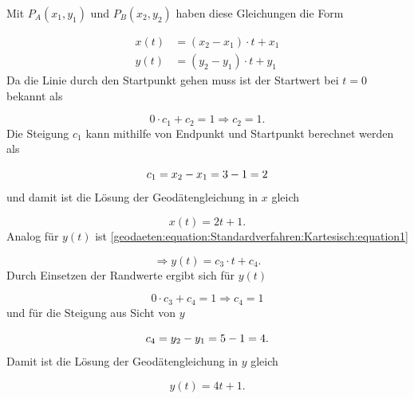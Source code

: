 Mit $P_A(x_1,y_1)$ und $P_B(x_2,y_2)$ haben diese Gleichungen die Form

\begin{align}
	x(t) &= (x_2 - x_1) \cdot t + x_1 \\
	y(t) &= (y_2 - y_1) \cdot t + y_1
\end{align}
Da die Linie durch den Startpunkt gehen muss ist der Startwert bei $t=0$ bekannt als
 
\begin{equation}
	0 \cdot c_1 + c_2 = 1 \Rightarrow c_2 = 1 .	
\end{equation}
Die Steigung $c_1$ kann mithilfe von Endpunkt und Startpunkt berechnet werden als

\begin{equation}
	c_1 = x_2 - x_1 \\ = 3-1 \\ = 2
\end{equation}
und damit ist die Lösung der Geodätengleichung in $x$ gleich

\begin{equation}
	x(t) = 2t + 1 .
\end{equation}
Analog für $y(t)$ ist \eqref{geodaeten:equation:Standardverfahren:Kartesisch:equation1}
  
\begin{equation}
	\Rightarrow y(t) = c_3 \cdot t + c_4  .
\end{equation}
Durch Einsetzen der Randwerte ergibt sich für $y(t)$ 

\begin{equation}
	0 \cdot c_3 + c_4 = 1 \Rightarrow c_4 = 1 
\end{equation}
und für die Steigung aus Sicht von $y$

\begin{equation}
	c_4 = y_2 - y_1 \\=5-1 = 4 .
\end{equation}
Damit ist die Lösung der Geodätengleichung in $y$ gleich

\begin{equation}
	y(t) = 4t + 1 .
\end{equation}


